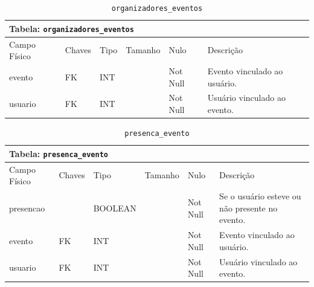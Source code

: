 \documentclass[12pt,a4paper]{article}
\begin{document}
\begin{center}
\begin{table}[h!]
	\caption{\texttt{organizadores\_eventos}}
	\label{tabela:organizadoresEventos}
	\begin{tabular}{|p{2.3cm}|p{1.2cm}|p{1.8cm}|p{1.5cm}|p{1cm}|p{6cm}|}\hline	
		\multicolumn{6}{|p{16cm}|}{\cellcolor{cinzaClaro}  \centering Tabela: \texttt{organizadores\_eventos}} \\ \hline %
		{\small Campo Físico}   & {\small Chaves} & {\small Tipo} & {\small Tamanho} & {\small Nulo} & {\small Descrição}\\\hline %
		
		{\tiny evento} & {\tiny FK} & {\tiny INT} & {\tiny } & {\tiny Not Null} &{\tiny Evento vinculado ao usuário.}\\\hline
		{\tiny usuario} & {\tiny FK} & {\tiny INT} & {\tiny } & {\tiny Not Null} &{\tiny Usuário vinculado ao evento.}\\\hline
			
	\end{tabular}
\end{table}	
\end{center}


\begin{center}
\begin{table}[h!]
	\caption{\texttt{presenca\_evento}}
	\label{tabela:presencaEvento}
	\begin{tabular}{|p{2.3cm}|p{1.2cm}|p{1.8cm}|p{1.5cm}|p{1cm}|p{6cm}|}\hline		
		\multicolumn{6}{|p{16cm}|}{\cellcolor{cinzaClaro}  \centering Tabela: \texttt{presenca\_evento}} \\ \hline %
		{\small Campo Físico}   & {\small Chaves} & {\small Tipo} & {\small Tamanho} & {\small Nulo} & {\small Descrição}\\\hline %
		
		{\tiny presencao}  & {\tiny } & {\tiny BOOLEAN } & {\tiny } & {\tiny Not Null} &{\tiny Se o usuário esteve ou não presente no evento.}\\\hline
		{\tiny evento}  & {\tiny FK} & {\tiny INT} & {\tiny } & {\tiny Not Null } &{\tiny Evento vinculado ao usuário.}\\\hline
		{\tiny usuario}  & {\tiny FK} & {\tiny INT} & {\tiny } & {\tiny Not Null} &{\tiny Usuário vinculado ao evento.}\\\hline
			
	\end{tabular}
\end{table}	
\end{center}
\end{document}
